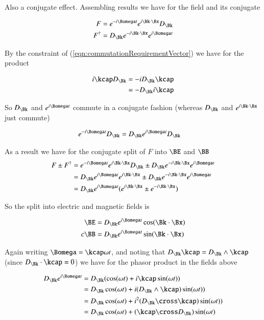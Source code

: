 Also a conjugate effect.  Assembling results we have for the field and its conjugate

\begin{align*}
F &= e^{-i\Bomega t} e^{i \Bk \cdot \Bx} D_\Bk  \\
F^\dagger &= D_\Bk e^{-i \Bk \cdot \Bx} e^{i\Bomega t}
\end{align*}

By the constraint of (\ref{eqn:commutationRequirementVector}) we have for the product

\begin{align*}
i \kcap D_\Bk 
&= 
-i D_\Bk \kcap \\
&= 
- D_\Bk i \kcap \\
\end{align*}

So $D_\Bk$ and $e^{i\Bomega t}$ commute in a conjugate fashion (whereas $D_\Bk$ and $e^{i\Bk \cdot \Bx}$ just commute)

\begin{align*}
e^{-i\Bomega t} D_\Bk &= D_\Bk e^{i\Bomega t} D_\Bk 
\end{align*}

As a result we have for the conjugate split of $F$ into $\BE$ and $\BB$
\begin{align*}
F \pm F^\dagger 
&= e^{-i\Bomega t} e^{i \Bk \cdot \Bx} D_\Bk \pm D_\Bk e^{-i \Bk \cdot \Bx} e^{i\Bomega t} \\
&= D_\Bk e^{i\Bomega t} e^{i \Bk \cdot \Bx} \pm D_\Bk e^{-i \Bk \cdot \Bx} e^{i\Bomega t} \\
&= D_\Bk e^{i\Bomega t} (e^{i \Bk \cdot \Bx} \pm e^{-i \Bk \cdot \Bx} ) \\
\end{align*}

So the split into electric and magnetic fields is

\begin{align*}
\BE &= D_\Bk e^{i\Bomega t} \cos(\Bk \cdot \Bx) \\
c\BB &= D_\Bk e^{i\Bomega t} \sin(\Bk \cdot \Bx)
\end{align*}

Again writing $\Bomega = \kcap \omega t$, and noting that $D_\Bk \kcap = D_\Bk \wedge \kcap$ (since $D_\Bk \cdot \kcap = 0$) we have for the phasor product in the fields above

\begin{align*}
D_\Bk e^{i\Bomega t} 
&=
D_\Bk (\cos(\omega t) + i\kcap \sin(\omega t)) \\
&=
D_\Bk \cos(\omega t) + i (D_\Bk \wedge \kcap) \sin(\omega t)) \\
&=
D_\Bk \cos(\omega t) + i^2 (D_\Bk \cross \kcap) \sin(\omega t)) \\
&=
D_\Bk \cos(\omega t) + (\kcap \cross D_\Bk) \sin(\omega t) \\
\end{align*}


